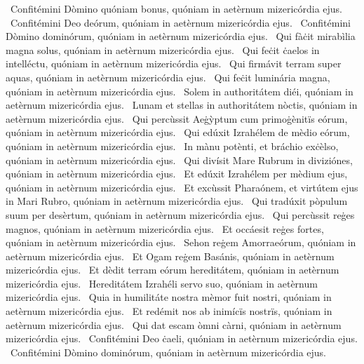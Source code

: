 ~Confitémini Dòmino quóniam bonus, quóniam in aetèrnum mizericórdia ejus. 
~Confitémini Deo deórum, quóniam in aetèrnum mizericórdia ejus. 
~Confitémini Dòmino dominórum, quóniam in aetèrnum mizericórdia ejus. 
~Qui fàċit mirabìlia magna solus, quóniam in aetèrnum mizericórdia ejus. 
~Qui feċit ċaelos in intelléctu, quóniam in aetèrnum mizericórdia ejus. 
~Qui firmávit terram super aquas, quóniam in aetèrnum mizericórdia ejus. 
~Qui feċit luminária magna, quóniam in aetèrnum mizericórdia ejus. 
~Solem in authoritátem diéi, quóniam in aetèrnum mizericórdia ejus. 
~Lunam et stellas in authoritátem nòctis, quóniam in aetèrnum mizericórdia ejus. 
~Qui percùssit Aeġỳptum cum primoġènitïs eórum, quóniam in aetèrnum mizericórdia ejus. 
~Qui edúxit Izrahélem de mèdio eórum, quóniam in aetèrnum mizericórdia ejus. 
~In mànu potènti, et bráchio exċèlso, quóniam in aetèrnum mizericórdia ejus. 
~Qui divísit Mare Rubrum in diviziónes, quóniam in aetèrnum mizericórdia ejus. 
~Et edúxit Izrahélem per mèdium ejus, quóniam in aetèrnum mizericórdia ejus. 
~Et excùssit Pharaónem, et virtútem ejus in Mari Rubro, quóniam in aetèrnum mizericórdia ejus. 
~Qui tradúxit pòpulum suum per desèrtum, quóniam in aetèrnum mizericórdia ejus. 
~Qui percùssit reġes magnos, quóniam in aetèrnum mizericórdia ejus. 
~Et occáesit reġes fortes, quóniam in aetèrnum mizericórdia ejus. 
~Sehon reġem Amorraeórum, quóniam in aetèrnum mizericórdia ejus. 
~Et Ogam reġem Basánis, quóniam in aetèrnum mizericórdia ejus. 
~Et dèdit terram eórum hereditátem, quóniam in aetèrnum mizericórdia ejus. 
~Hereditátem Izrahéli servo suo, quóniam in aetèrnum mizericórdia ejus. 
~Quia in humilitáte nostra mèmor fuit nostri, quóniam in aetèrnum mizericórdia ejus. 
~Et redémit nos ab inimícïs nostrïs, quóniam in aetèrnum mizericórdia ejus. 
~Qui dat escam òmni càrni, quóniam in aetèrnum mizericórdia ejus. 
~Confitémini Deo ċaeli, quóniam in aetèrnum mizericórdia ejus. 
~Confitémini Dòmino dominórum, quóniam in aetèrnum mizericórdia ejus. 
